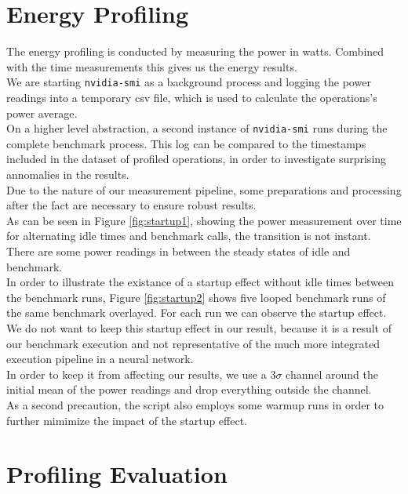 \section{Energy Profiling}



The energy profiling is conducted by measuring the power in watts. Combined with the time measurements this gives us the energy results. \\
We are starting \texttt{nvidia-smi} as a background process and logging the power readings into a temporary csv file, which is used to calculate the operations's power average. \\
On a higher level abstraction, a second instance of \texttt{nvidia-smi} runs during the complete benchmark process. This log can be compared to the timestamps included in the dataset of profiled operations, in order to investigate surprising annomalies in the results. \\
Due to the nature of our measurement pipeline, some preparations and processing after the fact are necessary to ensure robust results. \\
As can be seen in Figure \ref{fig:startup1}, showing the power measurement over time for alternating idle times and benchmark calls, the transition is not instant. There are some power readings in between the steady states of idle and benchmark. \\
In order to illustrate the existance of a startup effect without idle times between the benchmark runs, Figure \ref{fig:startup2} shows five looped benchmark runs of the same benchmark overlayed. For each run we can observe the startup effect. \\
We do not want to keep this startup effect in our result, because it is a result of our benchmark execution and not representative of the much more integrated execution pipeline in a neural network.\\
In order to keep it from affecting our results, we use a $3\sigma$ channel around the initial mean of the power readings and drop everything outside the channel. \\
As a second precaution, the script also employs some warmup runs in order to further mimimize the impact of the startup effect.\\



\section{Profiling Evaluation}


